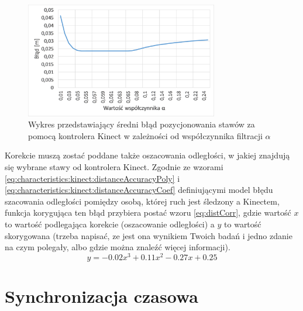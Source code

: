 \begin{figure}[!htb]
	\centering 
	\includegraphics[width=0.75\textwidth]{images/kinectPosErrorAlpha.png}
	\caption{Wykres przedstawiający średni błąd pozycjonowania stawów za pomocą kontrolera Kinect w zależności od współczynnika filtracji $\alpha$}
	\label{fig:hybrid:kinect:lpf}
\end{figure}

Korekcie muszą zostać poddane także oszacowania odległości, w jakiej znajdują się wybrane stawy od kontrolera Kinect. Zgodnie ze wzorami \eqref{eq:characteristics:kinect:distanceAccuracyPoly} i \eqref{eq:characteristics:kinect:distanceAccuracyCoef} definiującymi model błędu szacowania odległości pomiędzy osobą, której ruch jest śledzony a Kinectem, funkcja korygująca ten błąd przybiera postać wzoru \eqref{eq:distCorr}, gdzie wartość $x$ to wartość podlegająca korekcie (oszacowanie odległości) a $y$ to wartość skorygowana (trzeba napisać, ze jest ona wynikiem Twoich badań i jedno zdanie na czym polegały, albo gdzie można znaleźć więcej informacji).
\begin{equation}
	y = -0.02x^3 + 0.11x^2 - 0.27x + 0.25
	\label{eq:distCorr}
\end{equation}
 

\section{Synchronizacja czasowa}

